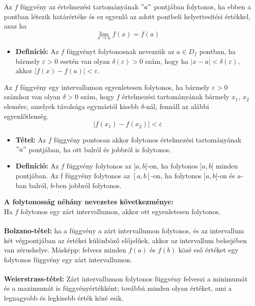 \documentclass[12pt,a4paper]{article}
\begin{document}
\begin{tcolorbox}[colback=green!5!white,colframe=green!60!black,title= 3. Függvény folytonosság]
    Az \(f\) függvény az értelmezési tartományának \("a"\) pontjában folytonos, ha ebben a pontban
létezik határértéke és ez egyenlő az adott pontbeli helyettesítési értékkel, azaz ha
$$\lim_{x \to a} f(x) = f(a) $$
    \begin{itemize}
        \item \textbf{Definíció:} Az \(f\) függvényt folytonosnak nevezzük az \(a \in D_f\) pontban, ha bármely \(\varepsilon > 0\)
        esetén van olyan \(\delta(\varepsilon) > 0\) szám, hogy ha \(|x - a| < \delta(\varepsilon)\), akkor \(|f(x) - f(a)| < \varepsilon\).
    \end{itemize}
    Az \(f\) függvény egy intervallumon egyenletesen folytonos, ha bármely \(\varepsilon > 0\) számhoz van
    olyan \(\delta > 0\) szám, hogy \(f\) értelmezési tartományának bármely \(x_1\), \(x_2\) elemére, amelyek
    távolsága egymástól kisebb \(\delta\)-nál, fennáll az alábbi egyenlőtlenség.
    $$|f(x_1) - f(x_2)| < \varepsilon$$
    \begin{itemize}
        \item \textbf{Tétel:} Az \(f\) függvény pontosan akkor folytonos értelmezési tartományának \("a"\) pontjában, ha
        ott balról és jobbról is folytonos.
        \item \textbf{Definíció:} Az \(f\) függvény folytonos az \( ] a, b [ \)-on, ha folytonos \(]a, b[ \) minden pontjában.
        Az f függvény folytonos az \([a, b]\)-on, ha folytonos \(]a, b[\)-on és \(a\)-ban balról, \(b\)-ben
        jobbról folytonos.
    \end{itemize}
    \textbf{A folytonosság néhány nevezetes következménye:}\\
        Ha \(f\) folytonos egy zárt intervallumon, akkor ott egyenletesen folytonos.\\\\
        \textbf{Bolzano-tétel:} ha a függvény a zárt intervallumon folytonos, és az intervallum két
        végpontjában az értékei különböző előjelűek, akkor az intervallum belsejében van
        zérushelye. Másképp: felvesz minden \(f(a)\) és \(f(b)\) közé eső értéket egy folytonos függvény egy zárt intervallumon.\\\\
        \textbf{Weierstrass-tétel:} Zárt intervallumon folytonos függvény felveszi a minimumát és a
        maximumát is függvényértékként; továbbá minden olyan értéket, ami a legnagyobb és
        legkisebb érték közé esik.

\end{tcolorbox}
\end{document}
